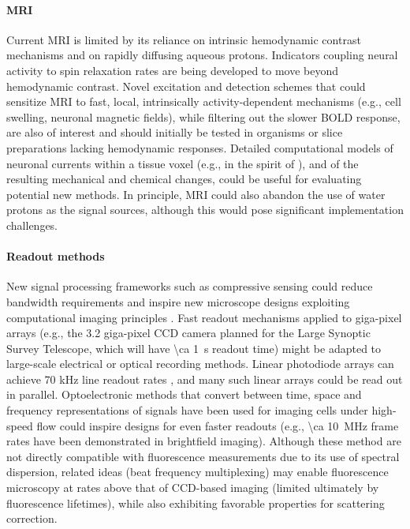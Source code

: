 \paragraph{MRI} Current MRI is limited by its reliance on intrinsic hemodynamic contrast mechanisms and on rapidly diffusing aqueous protons. Indicators coupling neural activity to spin relaxation rates are being developed to move beyond hemodynamic contrast. Novel excitation and detection schemes that could sensitize MRI to fast, local, intrinsically activity-dependent mechanisms (e.g., cell swelling, neuronal magnetic fields), while filtering out the slower BOLD response, are also of interest and should initially be tested in organisms or slice preparations lacking hemodynamic responses. Detailed computational models of neuronal currents within a tissue voxel (e.g., in the spirit of \cite{reimann2013biophysically}), and of the resulting mechanical and chemical changes, could be useful for evaluating potential new methods. In principle, MRI could also abandon the use of water protons as the signal sources, although this would pose significant implementation challenges.

\paragraph{Readout methods} New signal processing frameworks such as compressive sensing could reduce bandwidth requirements and inspire new microscope designs exploiting computational imaging principles \cite{raskar2009computational}. Fast readout mechanisms \cite{lauxtermann2001mega} applied to giga-pixel arrays (e.g., the 3.2 giga-pixel CCD camera planned for the Large Synoptic Survey Telescope, which will have \SI{\ca 1}{\second} readout time) might be adapted to large-scale electrical or optical recording methods. Linear photodiode arrays can achieve 70 kHz line readout rates \cite{PSeriesLinearArrayImager}, and many such linear arrays could be read out in parallel. Optoelectronic methods that convert between time, space and frequency representations of signals have been used for imaging cells under high-speed flow \cite{goda2012high, goda2009serial, goda2008amplified, goda2009theory, mahjoubfar2011high, tsia2010performance, goda2013dispersive} could inspire designs for even faster readouts (e.g., \SI{\ca 10}{\mega\hertz} frame rates have been demonstrated in brightfield imaging). Although these method are not directly compatible with fluorescence measurements due to its use of spectral dispersion, related ideas (beat frequency multiplexing) may enable fluorescence microscopy at rates above that of CCD-based imaging \cite{diebold2013digitally} (limited ultimately by fluorescence lifetimes), while also exhibiting favorable properties for scattering correction.


